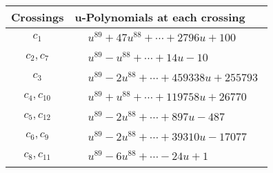 \documentclass[1p]{elsarticle_modified}
\theoremstyle{definition}
\begin{document}
\begin{tabular}{m{50pt}|m{274pt}}
Crossings & \hspace{64pt}u-Polynomials at each crossing \\
\hline $$\begin{aligned}c_{1}\end{aligned}$$&$\begin{aligned}
&u^{89}+47 u^{88}+\cdots+2796 u+100
\end{aligned}$\\
\hline $$\begin{aligned}c_{2},c_{7}\end{aligned}$$&$\begin{aligned}
&u^{89}- u^{88}+\cdots+14 u-10
\end{aligned}$\\
\hline $$\begin{aligned}c_{3}\end{aligned}$$&$\begin{aligned}
&u^{89}-2 u^{88}+\cdots+459338 u+255793
\end{aligned}$\\
\hline $$\begin{aligned}c_{4},c_{10}\end{aligned}$$&$\begin{aligned}
&u^{89}+u^{88}+\cdots+119758 u+26770
\end{aligned}$\\
\hline $$\begin{aligned}c_{5},c_{12}\end{aligned}$$&$\begin{aligned}
&u^{89}-2 u^{88}+\cdots+897 u-487
\end{aligned}$\\
\hline $$\begin{aligned}c_{6},c_{9}\end{aligned}$$&$\begin{aligned}
&u^{89}-2 u^{88}+\cdots+39310 u-17077
\end{aligned}$\\
\hline $$\begin{aligned}c_{8},c_{11}\end{aligned}$$&$\begin{aligned}
&u^{89}-6 u^{88}+\cdots-24 u+1
\end{aligned}$\\
\hline
\end{tabular}\\~\\
\newpage\renewcommand{\arraystretch}{1}
\end{document}

